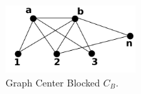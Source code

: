  \begin{figure}[htb]	
 \center%
 \includegraphics[width=5cm]{./img/obstrucaoCentro.png}
 \caption{Graph Center Blocked $C_B$.}
\label{fig:obstrucaoCentro}
\end{figure}  
 